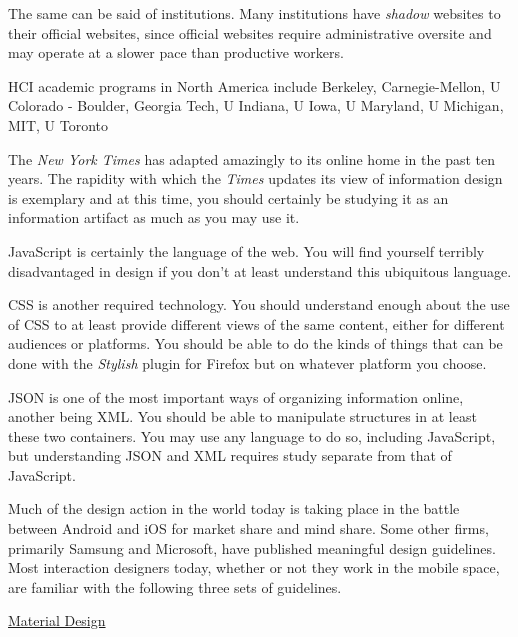 The same can be said of institutions. Many institutions have
\emph{shadow} websites to their official websites, since official
websites require administrative oversite and may operate at a slower
pace than productive workers.

\hypertarget{institutions}{%
\label{institutions}}

HCI academic programs in North America include Berkeley,
Carnegie-Mellon, U Colorado - Boulder, Georgia Tech, U Indiana, U Iowa,
U Maryland, U Michigan, MIT, U Toronto

The \emph{New York Times} has adapted amazingly to its online home in
the past ten years. The rapidity with which the \emph{Times} updates its
view of information design is exemplary and at this time, you should
certainly be studying it as an information artifact as much as you may
use it.

\hypertarget{technologies}{%
\label{technologies}}

JavaScript is certainly the language of the web. You will find yourself
terribly disadvantaged in design if you don't at least understand this
ubiquitous language.

CSS is another required technology. You should understand enough about
the use of CSS to at least provide different views of the same content,
either for different audiences or platforms. You should be able to do
the kinds of things that can be done with the \emph{Stylish} plugin for
Firefox but on whatever platform you choose.

JSON is one of the most important ways of organizing information online,
another being XML. You should be able to manipulate structures in at
least these two containers. You may use any language to do so, including
JavaScript, but understanding JSON and XML requires study separate from
that of JavaScript.

\hypertarget{design-guidelines-from-vendors}{%
\label{design-guidelines-from-vendors}}

Much of the design action in the world today is taking place in the
battle between Android and iOS for market share and mind share. Some
other firms, primarily Samsung and Microsoft, have published meaningful
design guidelines. Most interaction designers today, whether or not they
work in the mobile space, are familiar with the following three sets of
guidelines.

\href{https://material.io/design/}{Material Design}

